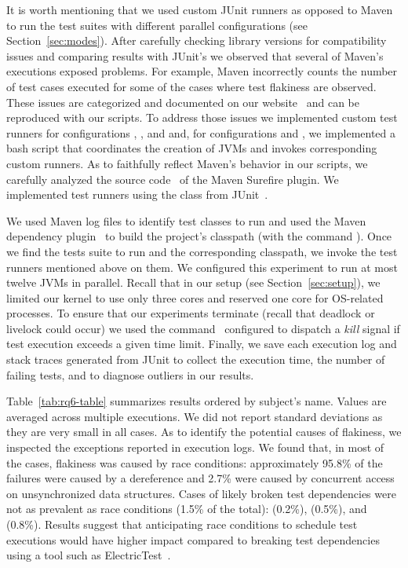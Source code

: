 \documentclass[10pt,journal,compsoc]{IEEEtran}
\begin{document}
It is worth mentioning that we used custom JUnit runners as opposed to
Maven to run the test suites with different parallel configurations
(see Section~\ref{sec:modes}).  After carefully checking library
versions for compatibility issues and comparing results with JUnit's
we observed that several of Maven's executions exposed problems.  For
example, Maven incorrectly counts the number of test cases executed
for some of the cases where test flakiness are observed. These issues are
categorized and documented on our website~\cite{ourwebpage} and can be
reproduced with our scripts.  To address those issues we implemented
custom test runners for configurations \emph{\SeqClassParMeth{}},
\emph{\ParClassSeqMeth{}}, and \emph{\ParClassParMeth{}} and,  for configurations
\emph{\ForkSeq{}} and \emph{\ForkParMeth{}}, we
implemented a bash script that coordinates the creation of JVMs and
invokes corresponding custom runners.  As to faithfully reflect
Maven's behavior in our scripts, we carefully analyzed the source
code~\cite{maven-surefire-source} of the Maven Surefire plugin. We
implemented test runners using the  class from
JUnit~\cite{junit-parallel}.  

We used Maven log files to identify test classes to run and used the
Maven dependency plugin~\cite{maven-dep} to build the project's
classpath (with the command ).
Once we find the tests suite to run and the corresponding classpath,
we invoke the test runners mentioned above on them.  We configured
this experiment to run at most twelve JVMs in parallel.  Recall that in
our setup (see Section~\ref{sec:setup}), we limited our kernel to use
only three cores and reserved one core for OS-related processes.  To
ensure that our experiments terminate (recall that deadlock or
livelock could occur) we used the 
command~\cite{timeout-cmd} configured to dispatch a \emph{kill} signal
if test execution exceeds a given time limit. Finally, we save each
execution log and stack traces generated from JUnit to collect the
execution time, the number of failing tests, and to diagnose outliers
in our results.

\sloppy Table~\ref{tab:rq6-table} summarizes results ordered by
subject's name.  Values are averaged across multiple executions.  We
did not report standard deviations as they are very small in all
cases.  As to identify the potential causes of flakiness, we inspected
the exceptions reported in execution logs. We found that, in most
of the cases, flakiness was caused by race conditions: approximately
95.8\% of the failures were caused by a  dereference and 2.7\% were
caused by concurrent access on unsynchronized data structures. Cases of likely
broken test dependencies were not as prevalent as race conditions
(1.5\% of the total):  (0.2\%),
 (0.5\%), and
 (0.8\%). Results suggest that
anticipating race conditions to schedule test executions would have
higher impact compared to breaking test dependencies using a tool such
as ElectricTest~\cite{bell-etal-esecfse2015}.
\end{document}
